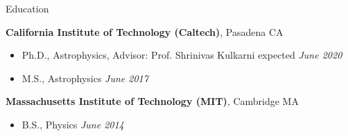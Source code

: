 \documentclass{resume} %
\begin{document}

\begin{rSection}{Education}

{\bf California Institute of Technology (Caltech)}, Pasadena CA
\begin{itemize}
\item Ph.D., Astrophysics, 
  Advisor: Prof. Shrinivas Kulkarni \hfill expected {\em June 2020} 
\end{itemize}

\begin{itemize}
  \item M.S., Astrophysics \hfill {\em June 2017}
\end{itemize}

{\bf Massachusetts Institute of Technology (MIT)}, Cambridge MA
\begin{itemize}
\item B.S., Physics \hfill {\em June 2014} 
\end{itemize}

\end{rSection}




\end{document}
